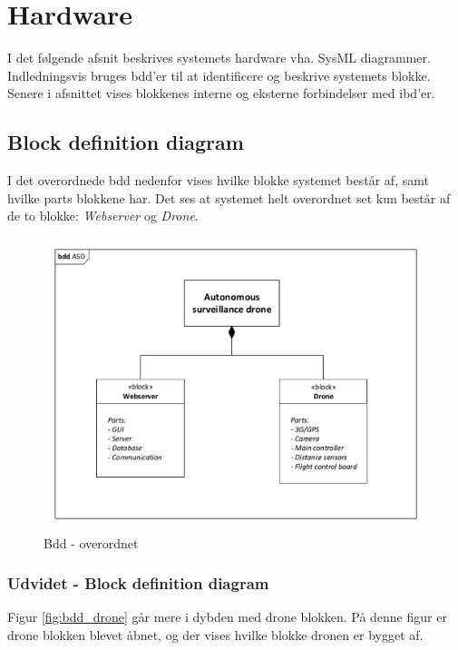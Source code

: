 \chapter{Hardware}

I det følgende afsnit beskrives systemets hardware vha. SysML diagrammer. 
Indledningsvis bruges bdd'er til at identificere og beskrive systemets blokke. Senere i afsnittet vises blokkenes interne og eksterne forbindelser med ibd'er.

\section{Block definition diagram}
I det overordnede bdd nedenfor vises hvilke blokke systemet består af, samt hvilke parts blokkene har. Det ses at systemet helt overordnet set kun består af de to blokke: \textit{Webserver} og \textit{Drone}. 

\begin{figure}[H]
\centering
\includegraphics[width=1\textwidth]{Billeder/BDD/bdd_overordnet.pdf}
\caption{Bdd - overordnet}
\label{fig:bdd_overordnet}
\end{figure}

\newpage
\subsection{Udvidet - Block definition diagram}
Figur \ref{fig:bdd_drone} går mere i dybden med drone blokken. På denne figur er drone blokken blevet åbnet, og der vises hvilke blokke dronen er bygget af. 

